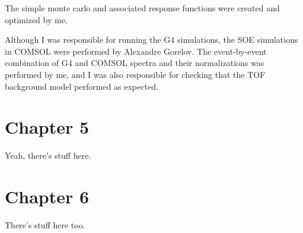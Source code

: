 The simple monte carlo and associated response functions were created and optimized by me.  

Although I was responsible for running the G4 simulations, the SOE simulations in COMSOL were performed by Alexandre Gorelov.  The event-by-event combination of G4 and COMSOL spectra and their normalizations was performed by me, and I was also responsible for checking that the TOF background model performed as expected.  
\section{Chapter 5}
Yeah, there's stuff here.
\section{Chapter 6}
There's stuff here too. 

